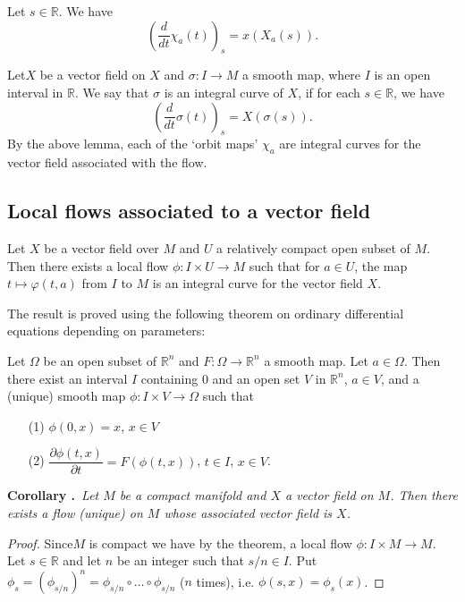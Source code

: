 \begin{lemma}\label{sec6-lem6.1}
Let $s\in \mathbb{R}$. We have
$$
\left(\dfrac{d}{dt}\chi_{a}(t)\right)_{s}=x(X_{a}(s)).
$$
\end{lemma}

Let\pageoriginale $X$ be a vector field on $X$ and $\sigma : I\to M$ a smooth map, where $I$ is an open interval in $\mathbb{R}$. We say that $\sigma$ is an integral curve of $X$, if for each $s\in \mathbb{R}$, we have
$$
\left(\dfrac{d}{dt}\sigma (t)\right)_{s}=X(\sigma(s)).
$$
By the above lemma, each of the `orbit maps' $\chi_{a}$ are integral curves for the vector field associated with the flow.

\subsection*{Local flows associated to a vector field}

\begin{theorem}\label{sec6-thm6.2}
Let $X$ be a vector field over $M$ and $U$ a relatively compact open subset of $M$. Then there exists a local flow $\phi:I\times U\to M$ such that for $a\in U$, the map $t\mapsto \varphi(t,a)$ from $I$ to $M$ is an integral curve for the vector field $X$.
\end{theorem}

The result is proved using the following theorem on ordinary differential equations depending on parameters:

Let $\Omega$ be an open subset of $\mathbb{R}^{n}$ and $F:\Omega\to \mathbb{R}^{n}$ a smooth map. Let $a\in \Omega$. Then there exist an interval $I$ containing $0$ and an open set $V$ in $\mathbb{R}^{n}$, $a\in V$, and a (unique) smooth map $\phi:I\times V\to \Omega$ such that
\begin{itemize}
\item[(1)] $\phi(0,x)=x$, $x\in V$

\item[(2)] $\dfrac{\partial \phi(t,x)}{\partial t}=F(\phi(t,x))$, $t\in I$, $x\in V$.
\end{itemize}

\noindent
{\bf Corollary .\label{sec6-coro6.2.1}}~{\em Let $M$ be a compact manifold and $X$ a vector field on $M$. Then there exists a flow (unique) on $M$ whose associated vector field is $X$.}

\begin{proof}
Since\pageoriginale $M$ is compact we have by the theorem, a local flow $\phi:I\times M\to M$. Let $s\in \mathbb{R}$ and let $n$ be an integer such that $s/n\in I$. Put $\phi_{s}=(\phi_{s/n})^{n}=\phi_{s/n}\circ\ldots\circ \phi_{s/n}$ ($n$ times), i.e. $\phi(s,x)=\phi_{s}(x)$.
\end{proof}

